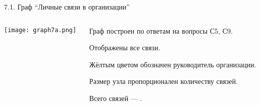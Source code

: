 \begin{frame}{7.1. Граф ``Личные связи в организации''}

\begin{columns}
\begin{column}{0.75\textwidth} 
\centering
          \texttt{[image: graph7a.png]}
\end{column}
\begin{column}{0.25\textwidth}
\tiny
Граф построен по ответам на вопросы С5, С9.
\smallskip

Отображены все связи. 
\smallskip

Жёлтым цветом обозначен руководитель организации.
\smallskip

Размер узла пропорционален количеству связей.
\bigskip

Всего связей --- \valGAlinks.

\end{column}
\end{columns}
\end{frame}


